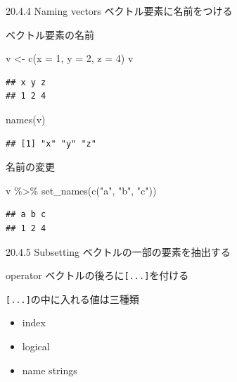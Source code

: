 \documentclass[
  ignorenonframetext,
]{beamer}
\newenvironment{Shaded}{\begin{snugshade}}{\end{snugshade}}
\newcommand{\AttributeTok}[1]{\textcolor[rgb]{0.77,0.63,0.00}{#1}}
\newcommand{\DecValTok}[1]{\textcolor[rgb]{0.00,0.00,0.81}{#1}}
\newcommand{\FunctionTok}[1]{\textcolor[rgb]{0.00,0.00,0.00}{#1}}
\newcommand{\NormalTok}[1]{#1}
\newcommand{\OtherTok}[1]{\textcolor[rgb]{0.56,0.35,0.01}{#1}}
\newcommand{\SpecialCharTok}[1]{\textcolor[rgb]{0.00,0.00,0.00}{#1}}
\newcommand{\StringTok}[1]{\textcolor[rgb]{0.31,0.60,0.02}{#1}}
\providecommand{\tightlist}{%
  \setlength{\itemsep}{0pt}\setlength{\parskip}{0pt}}
\begin{document}
\begin{frame}{20.4.4 Naming vectors}
\protect\hypertarget{naming-vectors}{}
ベクトル要素に名前をつける
\end{frame}

\begin{frame}[fragile]{ベクトル要素の名前}
\protect\hypertarget{ux30d9ux30afux30c8ux30ebux8981ux7d20ux306eux540dux524d}{}
\begin{Shaded}
\begin{Highlighting}[]
\NormalTok{v }\OtherTok{\textless{}{-}} \FunctionTok{c}\NormalTok{(}\AttributeTok{x =} \DecValTok{1}\NormalTok{, }\AttributeTok{y =} \DecValTok{2}\NormalTok{, }\AttributeTok{z =} \DecValTok{4}\NormalTok{)}
\NormalTok{v}
\end{Highlighting}
\end{Shaded}

\begin{verbatim}
## x y z 
## 1 2 4
\end{verbatim}

\begin{Shaded}
\begin{Highlighting}[]
\FunctionTok{names}\NormalTok{(v)}
\end{Highlighting}
\end{Shaded}

\begin{verbatim}
## [1] "x" "y" "z"
\end{verbatim}
\end{frame}

\begin{frame}[fragile]{名前の変更}
\protect\hypertarget{ux540dux524dux306eux5909ux66f4}{}
\begin{Shaded}
\begin{Highlighting}[]
\NormalTok{v }\SpecialCharTok{\%\textgreater{}\%} \FunctionTok{set\_names}\NormalTok{(}\FunctionTok{c}\NormalTok{(}\StringTok{"a"}\NormalTok{, }\StringTok{"b"}\NormalTok{, }\StringTok{"c"}\NormalTok{))}
\end{Highlighting}
\end{Shaded}

\begin{verbatim}
## a b c 
## 1 2 4
\end{verbatim}
\end{frame}

\begin{frame}[fragile]{20.4.5 Subsetting}
\protect\hypertarget{subsetting}{}
ベクトルの一部の要素を抽出する

\begin{block}{operator}
\protect\hypertarget{operator}{}
ベクトルの後ろに\texttt{{[}...{]}}を付ける

\texttt{{[}...{]}}の中に入れる値は三種類

\begin{itemize}
\tightlist
\item
  index
\item
  logical
\item
  name strings
\end{itemize}
\end{block}
\end{frame}
\end{document}
